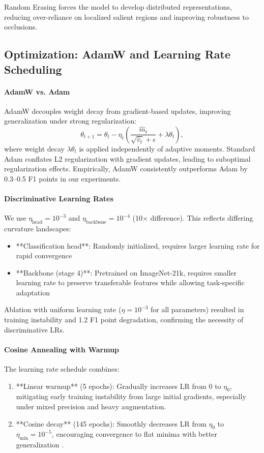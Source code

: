 \documentclass[11pt,a4paper]{article}
\begin{document}
Random Erasing forces the model to develop distributed representations, reducing over-reliance on localized salient regions and improving robustness to occlusions.

\subsection{Optimization: AdamW and Learning Rate Scheduling}

\paragraph{AdamW vs. Adam} AdamW \cite{loshchilov2017decoupled} decouples weight decay from gradient-based updates, improving generalization under strong regularization:
\begin{equation}
\theta_{t+1} = \theta_t - \eta_t \left( \frac{\hat{m}_t}{\sqrt{\hat{v}_t} + \epsilon} + \lambda \theta_t \right),
\end{equation}
where weight decay \(\lambda \theta_t\) is applied independently of adaptive moments. Standard Adam conflates L2 regularization with gradient updates, leading to suboptimal regularization effects. Empirically, AdamW consistently outperforms Adam by 0.3--0.5 F1 points in our experiments.

\paragraph{Discriminative Learning Rates} We use \(\eta_{\text{head}}=10^{-3}\) and \(\eta_{\text{backbone}}=10^{-4}\) (10\(\times\) difference). This reflects differing curvature landscapes:
\begin{itemize}[leftmargin=*]
\item **Classification head**: Randomly initialized, requires larger learning rate for rapid convergence
\item **Backbone (stage 4)**: Pretrained on ImageNet-21k, requires smaller learning rate to preserve transferable features while allowing task-specific adaptation
\end{itemize}

Ablation with uniform learning rate (\(\eta=10^{-3}\) for all parameters) resulted in training instability and 1.2 F1 point degradation, confirming the necessity of discriminative LRs.

\paragraph{Cosine Annealing with Warmup} The learning rate schedule combines:
\begin{enumerate}[leftmargin=*]
\item **Linear warmup** (5 epochs): Gradually increases LR from 0 to \(\eta_0\), mitigating early training instability from large initial gradients, especially under mixed precision and heavy augmentation.
\item **Cosine decay** (145 epochs): Smoothly decreases LR from \(\eta_0\) to \(\eta_{\min}=10^{-5}\), encouraging convergence to flat minima with better generalization \cite{loshchilov2017sgdr}.
\end{enumerate}
\end{document}

